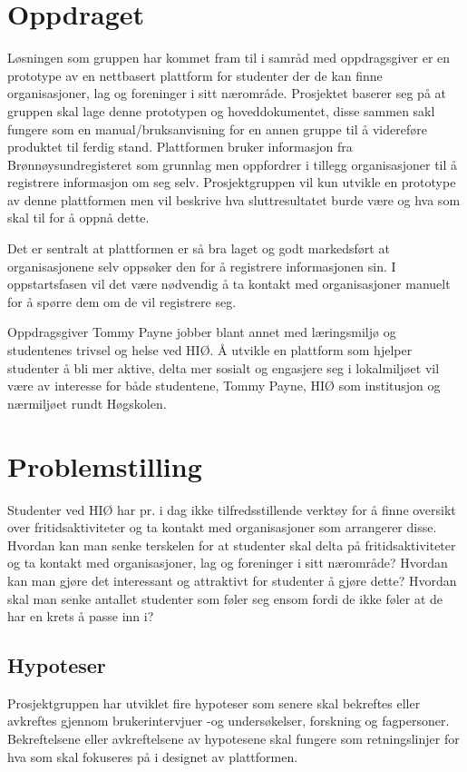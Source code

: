 \section{Oppdraget}
Løsningen som gruppen har kommet fram til i samråd med oppdragsgiver er en prototype av en nettbasert plattform for studenter der de kan finne organisasjoner, lag og foreninger i sitt nærområde. Prosjektet baserer seg på at gruppen skal lage denne prototypen og hoveddokumentet, disse sammen sakl fungere som en manual/bruksanvisning for en annen gruppe til å videreføre produktet til ferdig stand.  Plattformen bruker informasjon fra Brønnøysundregisteret som grunnlag men oppfordrer i tillegg organisasjoner til å registrere informasjon om seg selv. Prosjektgruppen vil kun utvikle en prototype av denne plattformen men vil beskrive hva sluttresultatet burde være og hva som skal til for å oppnå dette. 

Det er sentralt at plattformen er så bra laget og godt markedsført at organisasjonene selv oppsøker den for å registrere informasjonen sin. I oppstartsfasen vil det være nødvendig å ta kontakt med organisasjoner manuelt for å spørre dem om de vil registrere seg.

Oppdragsgiver Tommy Payne jobber blant annet med læringsmiljø og studentenes trivsel og helse ved HIØ. Å utvikle en plattform som hjelper studenter å bli mer aktive, delta mer sosialt og engasjere seg i lokalmiljøet vil være av interesse for både studentene, Tommy Payne, HIØ som institusjon og nærmiljøet rundt Høgskolen.

\section{Problemstilling}
Studenter ved HIØ har pr. i dag ikke tilfredsstillende verktøy for å finne oversikt over fritidsaktiviteter og ta kontakt med organisasjoner som arrangerer disse. Hvordan kan man senke terskelen for at studenter skal delta på fritidsaktiviteter og ta kontakt med organisasjoner, lag og foreninger i sitt nærområde? Hvordan kan man gjøre det interessant og attraktivt for studenter å gjøre dette?
Hvordan skal man senke antallet studenter som føler seg ensom fordi de ikke føler at de har en krets å passe inn i?

\subsection{Hypoteser}
\label{section:hypoteser}
Prosjektgruppen har utviklet fire hypoteser som senere skal bekreftes eller avkreftes gjennom brukerintervjuer -og undersøkelser, forskning og fagpersoner. Bekreftelsene eller avkreftelsene av hypotesene skal fungere som retningslinjer for hva som skal fokuseres på i designet av plattformen.

